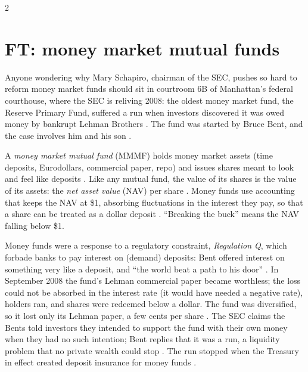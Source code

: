 \begin{paracol}{2}
\section{FT: money market mutual funds}\label{sec:bl-ft}

\begin{casestudy}
Anyone wondering why Mary Schapiro, chairman of the SEC, pushes so hard to reform money market funds should sit in courtroom 6B of Manhattan's federal courthouse,
where the SEC is reliving 2008: the oldest money market fund, the Reserve Primary Fund, suffered a run when investors discovered it was owed money by bankrupt Lehman
Brothers . The fund was started by Bruce Bent, and the case involves him and his son .
\end{casestudy}

\begin{definition}
A \emph{money market mutual fund} (MMMF) holds money market assets (time deposits, Eurodollars, commercial paper, repo) and issues shares meant to look and feel like
deposits . Like any mutual fund, the value of its shares is the value of its assets: the \emph{net asset value} (NAV) per share
. Money funds use accounting that keeps the NAV at \$1, absorbing fluctuations in the interest they pay, so that a share can be treated as a
dollar deposit . ``Breaking the buck'' means the NAV falling below \$1.
\end{definition}

\begin{taccts}
\end{taccts}
Money funds were a response to a regulatory constraint, \emph{Regulation Q}, which forbade banks to pay interest on (demand) deposits: Bent offered interest on something
very like a deposit, and ``the world beat a path to his door'' . In September 2008 the fund's Lehman commercial paper became worthless; the
loss could not be absorbed in the interest rate (it would have needed a negative rate), holders ran, and shares were redeemed below a dollar. The fund was diversified, so it
lost only its Lehman paper, a few cents per share . The SEC claims the Bents told investors they intended to support the fund with
their own money when they had no such intention; Bent replies that it was a run, a liquidity problem that no private wealth could stop . The run stopped when the
Treasury in effect created deposit insurance for money funds .


\end{paracol}
